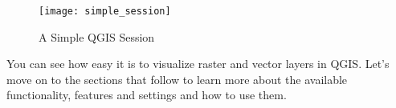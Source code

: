 \begin{figure}[ht]
   \begin{center}
   \caption{A Simple QGIS Session \nixcaption}\label{fig:simple_session}\smallskip
   \texttt{[image: simple\_session]}
\end{center}  
\end{figure}

You can see how easy it is to visualize raster and vector layers in 
QGIS. Let's move on to the sections that follow to learn more about the 
available functionality, features and settings and how to use them.

